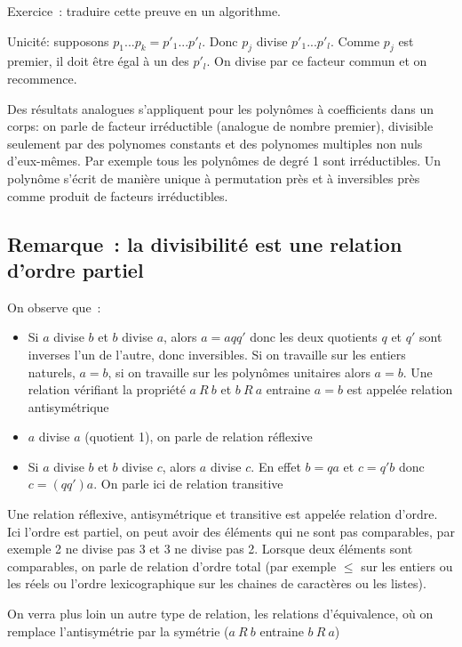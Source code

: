 \documentclass[a4paper,11pt]{book}
\begin{document}
\begin{giacjshere}
Exercice~: traduire cette preuve en un algorithme.

Unicit\'e: supposons $p_1...p_k=p'_1...p'_l$. Donc $p_j$ divise
$p'_1...p'_l$. Comme $p_j$ est premier, il doit \^etre \'egal \`a un
des $p'_l$. On divise par ce facteur commun et on recommence.

Des r\'esultats analogues s'appliquent pour les polyn\^omes \`a
coefficients dans un corps: 
on parle de facteur irr\'eductible (analogue de nombre premier),
divisible seulement par des polynomes constants et des polynomes multiples non
nuls d'eux-m\^emes. Par exemple tous les polyn\^omes de degr\'e
1 sont irr\'eductibles. Un polyn\^ome s'\'ecrit de mani\`ere unique \`a
permutation pr\`es et \`a inversibles pr\`es comme produit de facteurs
irr\'eductibles.

\subsection{Remarque~: la divisibilit\'e est une relation d'ordre partiel}
On observe que~:
\begin{itemize}
\item Si $a$ divise $b$ et $b$ divise $a$, alors $a=aqq'$ donc les deux
quotients $q$ et $q'$ sont inverses l'un de l'autre, donc inversibles.
Si on travaille sur les entiers naturels, $a=b$, si on travaille sur
les polyn\^omes unitaires alors $a=b$.
Une relation v\'erifiant la propri\'et\'e $a\ R\ b$ et $b\ R\ a$ entraine
$a=b$ est appel\'ee relation antisym\'etrique
\item $a$ divise $a$ (quotient 1), on parle de relation r\'eflexive 
\item
Si $a$ divise $b$ et $b$ divise $c$, alors $a$ divise $c$.
En effet $b=qa$ et $c=q'b$ donc $c=(qq')a$. On parle
ici de relation transitive
\end{itemize}
Une relation r\'eflexive, antisym\'etrique et transitive est appel\'ee
relation d'ordre. Ici l'ordre est partiel, on peut avoir des
\'el\'ements
qui ne sont pas comparables, par exemple 2 ne divise pas 3 et 3 ne
divise pas 2. Lorsque deux \'el\'ements sont comparables, on parle
de relation d'ordre total (par exemple $\leq$ sur les entiers ou les
r\'eels ou l'ordre lexicographique sur les chaines de caract\`eres ou
les listes).

On verra plus loin un autre type de relation, les relations
d'\'equivalence, o\`u on remplace l'antisym\'etrie par la sym\'etrie
($a\ R\ b$ entraine $b\ R\ a$)



\end{giacjshere}
\end{document}
